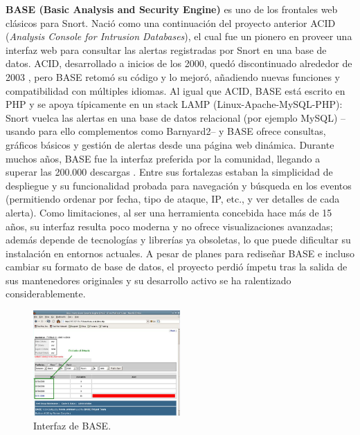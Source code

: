 \documentclass[11pt,a4paper,twoside]{report}
\begin{document}
\textbf{BASE (Basic Analysis and Security Engine)} es uno de los frontales web clásicos para Snort. Nació como una continuación del proyecto anterior ACID (\textit{Analysis Console for Intrusion Databases}), el cual fue un pionero en proveer una interfaz web para consultar las alertas registradas por Snort en una base de datos. ACID, desarrollado a inicios de los 2000, quedó discontinuado alrededor de 2003 \cite{SnorbyHelpnet2010}, pero BASE retomó su código y lo mejoró, añadiendo nuevas funciones y compatibilidad con múltiples idiomas. Al igual que ACID, BASE está escrito en PHP y se apoya típicamente en un stack LAMP (Linux-Apache-MySQL-PHP): Snort vuelca las alertas en una base de datos relacional (por ejemplo MySQL) –usando para ello complementos como Barnyard2– y BASE ofrece consultas, gráficos básicos y gestión de alertas desde una página web dinámica. Durante muchos años, BASE fue la interfaz preferida por la comunidad, llegando a superar las 200.000 descargas \cite{base-sourceforge}. Entre sus fortalezas estaban la simplicidad de despliegue y su funcionalidad probada para navegación y búsqueda en los eventos (permitiendo ordenar por fecha, tipo de ataque, IP, etc., y ver detalles de cada alerta). Como limitaciones, al ser una herramienta concebida hace más de 15 años, su interfaz resulta poco moderna y no ofrece visualizaciones avanzadas; además depende de tecnologías y librerías ya obsoletas, lo que puede dificultar su instalación en entornos actuales. A pesar de planes para rediseñar BASE e incluso cambiar su formato de base de datos, el proyecto perdió ímpetu tras la salida de sus mantenedores originales y su desarrollo activo se ha ralentizado considerablemente.

\begin{figure}[H]
	\centering
	\includegraphics[width=0.5\textwidth]{documento/18.png}
	\caption{Interfaz de BASE.}
	\label{fig:base-interface}
\end{figure}
\end{document}
